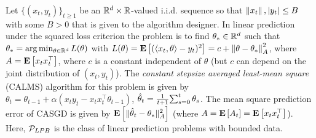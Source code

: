 \begin{example}
\label{ex:linpred}
Let $\{(x_t,y_t)\}_{t\ge 1}$ be an $\R^{d}\times \R$-valued i.i.d. sequence so that $\norm{x_t},|y_t|\le B$ with some $B>0$ that is given to the algorithm designer.
In linear prediction under the squared loss criterion the problem is to find $\ts\in \R^d$ such that 
$\ts = \arg\min_{\theta\in \R^d} L(\theta)$ with $L(\theta)= \EE{ (\ip{x_t,\theta}-y_t)^2 } =c + \norm{\theta-\ts}_{A}^2$, where $A = \EE{x_t x_t^\top}$, where $c$ is a constant independent of $\theta$ (but $c$ can depend on the joint distribution of $(x_t,y_t)$).
The \emph{constant stepsize averaged least-mean square} (CALMS) algorithm for this problem is given by 
$\theta_t=\theta_{t-1}+\alpha(x_t y_t-x_tx_t^\top\theta_{t-1})$,
$\thh_t=\frac{1}{t+1}{\sum}_{s=0}^{t}\,\theta_s$. 
The mean square prediction error of CASGD is given by $\EE{\normsm{\thh_t-\ts}^2_A}$ (where $A=\EE{A_t}=\EE{x_tx_t^\top}$). Here, $\P_{LPB}$ is the class of linear prediction problems with bounded data.
\fi
\end{example}
\begin{comment}
\begin{table}[H]
\resizebox{\columnwidth}{!}{
\begin{tabular}{|c|c|}\hline
TD(0)& GTD\\ \hline
$\begin{aligned}\label{eq:td}
\quad\delta_t &= r_t+(\gamma \phi'_t-\phi_t)^\top \theta_t,\\
\quad\theta_{t+1}&= \theta_t+\alpha \rho_t\phi_t (\delta_t),\\
\quad\thh_{t} &= \frac{1}{t+1}\sum_{s=0}^t \theta_s
\end{aligned}
$ & $\begin{aligned}\label{eq:gtd}
\quad\Delta_t&=\phi_t(\gamma \phi'_t-\phi_t)^\top,\\
y_{t+1}&=y_t+\beta\rho_t(\phi_t r_t+\Delta_t\theta_t -y_t),\\
\theta_{t+1}&=\theta_t+\alpha\Delta_t^\top y_{t+1}\\
\thh_{t}&=\frac{1}{t+1}\sum_{s=0}^t \theta_s, \hat{y}_{t}=\frac{1}{t+1}\sum_{s=0}^t y_s, 
\end{aligned}
$ \\\hline
\end{tabular}
}
\caption{Shows the TD(0) and GTD algorithms. In this paper, we let $\beta=\alpha$ in GTD. It is straightforward to write down appropriate $A_t$ and $b_t$ for the two algorithms, and we leave it as an exercise. 
}
\label{tb:tdalgos}
\end{table}
\end{comment}




